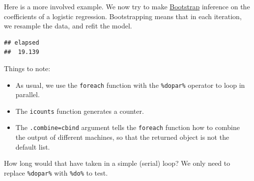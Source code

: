 \documentclass[]{book}
\newenvironment{Shaded}{\begin{snugshade}}{\end{snugshade}}
\newcommand{\KeywordTok}[1]{\textcolor[rgb]{0.13,0.29,0.53}{\textbf{#1}}}
\newcommand{\DataTypeTok}[1]{\textcolor[rgb]{0.13,0.29,0.53}{#1}}
\newcommand{\DecValTok}[1]{\textcolor[rgb]{0.00,0.00,0.81}{#1}}
\newcommand{\FloatTok}[1]{\textcolor[rgb]{0.00,0.00,0.81}{#1}}
\newcommand{\StringTok}[1]{\textcolor[rgb]{0.31,0.60,0.02}{#1}}
\newcommand{\OtherTok}[1]{\textcolor[rgb]{0.56,0.35,0.01}{#1}}
\newcommand{\OperatorTok}[1]{\textcolor[rgb]{0.81,0.36,0.00}{\textbf{#1}}}
\newcommand{\NormalTok}[1]{#1}
\providecommand{\tightlist}{%
  \setlength{\itemsep}{0pt}\setlength{\parskip}{0pt}}
\theoremstyle{definition}
\theoremstyle{definition}
\theoremstyle{definition}
\theoremstyle{remark}
\begin{document}
Here is a more involved example. We now try to make
\href{https://en.wikipedia.org/wiki/Bootstrapping_(statistics)}{Bootstrap}
inference on the coefficients of a logistic regression. Bootstrapping
means that in each iteration, we resample the data, and refit the model.

\begin{Shaded}
\end{Shaded}

\begin{verbatim}
## elapsed 
##  19.139
\end{verbatim}

Things to note:

\begin{itemize}
\tightlist
\item
  As usual, we use the \texttt{foreach} function with the
  \texttt{\%dopar\%} operator to loop in parallel.
\item
  The \texttt{icounts} function generates a counter.
\item
  The \texttt{.combine=cbind} argument tells the \texttt{foreach}
  function how to combine the output of different machines, so that the
  returned object is not the default list.
\end{itemize}

How long would that have taken in a simple (serial) loop? We only need
to replace \texttt{\%dopar\%} with \texttt{\%do\%} to test.
\end{document}

